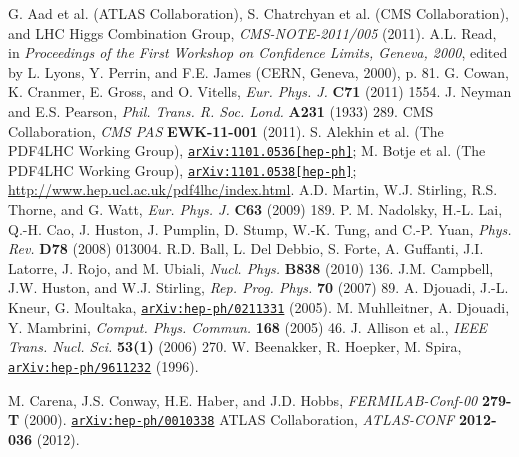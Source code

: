 \documentclass[12pt, letterpaper]{report}
\begin{document}
\begin{thebibliography}{99}
 G. Aad et al. (ATLAS Collaboration), S. Chatrchyan et al. (CMS Collaboration), and LHC Higgs Combination Group, \textit{CMS-NOTE-2011/005} (2011).
 A.L. Read, in \textit{Proceedings of the First Workshop on Confidence Limits, Geneva, 2000}, edited by L. Lyons, Y. Perrin, and F.E. James (CERN, Geneva, 2000), p. 81.
 G. Cowan, K. Cranmer, E. Gross, and O. Vitells, \textit{Eur. Phys. J.} \textbf{C71} (2011) 1554.
 J. Neyman and E.S. Pearson, \textit{Phil. Trans. R. Soc. Lond.} \textbf{A231} (1933) 289.
 CMS Collaboration, \textit{CMS PAS} \textbf{EWK-11-001} (2011).
 S. Alekhin et al. (The PDF4LHC Working Group), \href{http://arxiv.org/abs/1101.0536}{\texttt{arXiv:1101.0536[hep-ph]}}; M. Botje et al. (The PDF4LHC Working Group), \href{http://arxiv.org/abs/1101.0538}{\texttt{arXiv:1101.0538[hep-ph]}}; \url{http://www.hep.ucl.ac.uk/pdf4lhc/index.html}.
 A.D. Martin, W.J. Stirling, R.S. Thorne, and G. Watt, \textit{Eur. Phys. J.} \textbf{C63} (2009) 189.
 P. M. Nadolsky, H.-L. Lai, Q.-H. Cao, J. Huston, J. Pumplin, D. Stump, W.-K. Tung, and C.-P. Yuan, \textit{Phys. Rev.} \textbf{D78} (2008) 013004.
 R.D. Ball, L. Del Debbio, S. Forte, A. Guffanti, J.I. Latorre, J. Rojo, and M. Ubiali, \textit{Nucl. Phys.} \textbf{B838} (2010) 136.
 J.M. Campbell, J.W. Huston, and W.J. Stirling, \textit{Rep. Prog. Phys.} \textbf{70} (2007) 89.
 A. Djouadi, J.-L. Kneur, G. Moultaka, \href{http://arxiv.org/abs/hep-ph/0211331}{\texttt{arXiv:hep-ph/0211331}} (2005).
 M. Muhlleitner, A. Djouadi, Y. Mambrini, \textit{Comput. Phys. Commun.} \textbf{168} (2005) 46.
 J. Allison et al., \textit{IEEE Trans. Nucl. Sci.} \textbf{53(1)} (2006) 270.
 W. Beenakker, R. Hoepker, M. Spira, \href{http://arxiv.org/abs/hep-ph/9611232}{\texttt{arXiv:hep-ph/9611232}} (1996).


 M. Carena, J.S. Conway, H.E. Haber, and J.D. Hobbs, \textit{FERMILAB-Conf-00} \textbf{279-T} (2000).  \href{http://arxiv.org/abs/hep-ph/0010338}{\texttt{arXiv:hep-ph/0010338}}
 ATLAS Collaboration, \textit{ATLAS-CONF} \textbf{2012-036} (2012).



\end{thebibliography}
\end{document}
